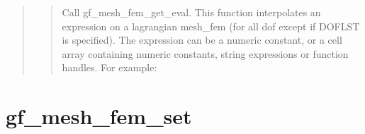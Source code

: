 \documentclass[a4paper,11pt,english]{sphinxmanual}
\begin{document}
\begin{quote}
\begin{quote}
Call gf\_mesh\_fem\_get\_eval. This function interpolates an expression on a
lagrangian mesh\_fem (for all dof except if DOFLST is specified).
The expression can be a
numeric constant, or a cell array containing numeric constants, string
expressions or function handles. For example:

\begin{sphinxVerbatim}[commandchars=\\\{\}]
\PYG{p}{[}\PYG{p}{]}     
\PYG{p}{[} \PYG{p}{]}         
\end{sphinxVerbatim}
\end{quote}
\end{quote}


\section{gf\_mesh\_fem\_set}
\label{\detokenize{matlab_octave/cmdref_gf_mesh_fem_set:gf-mesh-fem-set}}\label{\detokenize{matlab_octave/cmdref_gf_mesh_fem_set::doc}}
\end{document}
